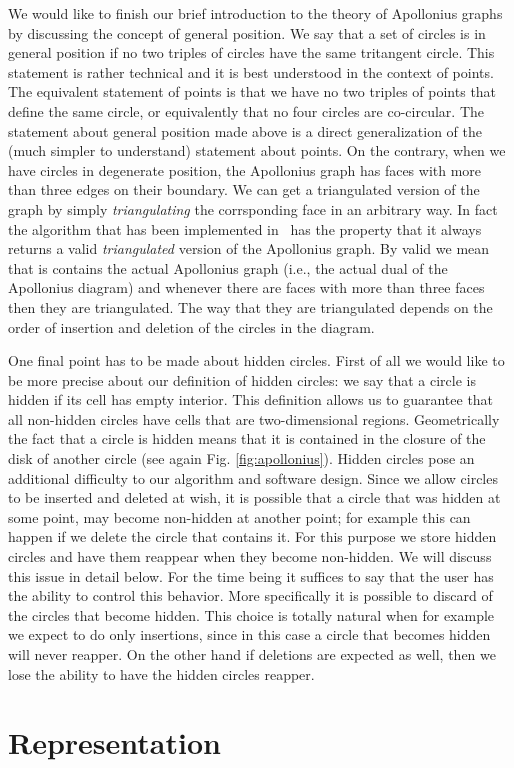 We would like to finish our brief introduction to the theory of
Apollonius graphs by discussing the concept of general position. We say
that a set of circles is in general position if no two triples of
circles have the same tritangent circle. This statement is rather
technical and it is best understood in the context of points. The
equivalent statement of points is that we have no two triples of
points that define the same circle, or equivalently that no four
circles are co-circular. The statement about general position made
above is a direct generalization of the (much simpler to understand)
statement about points. On the contrary, when we have circles in
degenerate position, the Apollonius graph has faces with more than
three edges on their boundary. We can get a triangulated version of
the graph by simply {\em triangulating} the corrsponding face in an
arbitrary way. In fact the algorithm that has been implemented in
\cgal\ has the property that it always returns a valid
{\em triangulated} version of the Apollonius graph. By valid we mean
that is contains the actual Apollonius graph (i.e., the actual dual of
the Apollonius diagram) and whenever there are faces with more than
three faces then they are triangulated. The way that they are
triangulated depends on the order of insertion and deletion of the
circles in the diagram.



One final point has to be made about hidden circles. First of all we
would like to be more precise about our definition of hidden circles:
we say that a circle is hidden if its cell has empty interior. This
definition allows us to guarantee that all non-hidden circles have
cells that are two-dimensional regions.
Geometrically the fact that a circle is hidden means that it is
contained in the closure of the disk of another circle (see again
Fig. \ref{fig:apollonius}). Hidden circles pose an additional
difficulty to our algorithm and software design. Since we allow
circles to be inserted and deleted at wish, it is possible that a
circle that was hidden at some point, may become non-hidden at another
point; for example this can happen if we delete the circle that
contains it. For this purpose we store hidden circles and have them
reappear when they become non-hidden. We will discuss this issue in
detail below. For the time being it suffices to say that the user has
the ability to control this behavior. More specifically it is possible
to discard of the circles that become hidden. This choice is totally
natural when for example we expect to do only insertions, since in
this case a circle that becomes hidden will never reapper. On the
other hand if deletions are expected as well, then we lose the ability
to have the hidden circles reapper.


\section{Representation}
\label{sec:apollonius2-representation}


